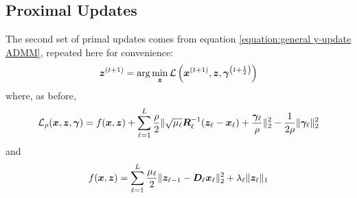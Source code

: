 \subsection{Proximal Updates}
The second set of primal updates comes from equation \ref{equation:general y-update ADMM}, repeated here for convenience:
\begin{equation}
\bm{z}^{(t + 1)} = \arg\min_{\bm{z}} \mathcal{L}\left(\bm{x}^{(t + 1)},\bm{z},\bm{\gamma}^{\left(t + \frac{1}{2}\right)}\right)
\end{equation}
where, as before,
\begin{equation}
\mathcal{L}_{\rho}(\bm{x},\bm{z},\bm{\gamma}) = f(\bm{x},\bm{z})  +  \sum_{\ell = 1}^L \frac{\rho}{2}\|\sqrt{\mu_{\ell}}\bm{R}_{\ell}^{-1}(\bm{z}_{\ell} - \bm{x}_{\ell}) + \frac{\bm{\gamma}_{\ell}}{\rho}\|_2^2  - \frac{1}{2\rho}\|\bm{\gamma}_{\ell}\|_2^2
\end{equation}
%
and
\begin{equation}
f(\bm{x},\bm{z}) = \sum_{\ell = 1}^{L} \frac{\mu_{\ell}}{2}\|\bm{z}_{\ell - 1} -\bm{D}_{\ell}\bm{x}_{\ell}\|_2^2 + \lambda_{\ell}\|\bm{z}_{\ell}\|_1
\end{equation}

